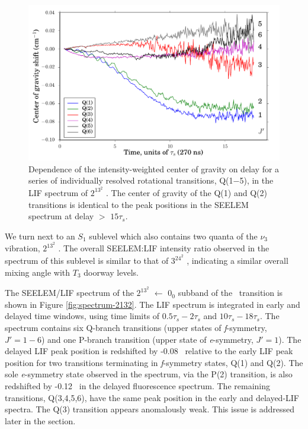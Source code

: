 \begin{figure}
  \caption{Dependence of the intensity-weighted center of gravity on
    delay for a series of individually resolved rotational
    transitions, Q(1$-$5), in the LIF spectrum of $2^13^2$ .
    The center of gravity of the Q(1) and Q(2) transitions is
    identical to the peak positions in the SEELEM spectrum at
    delay $>$ $15\tau_s$.}
  \label{fig:2132-q123456-cog-delay}
  \centering
  \vspace{1cm}
  \includegraphics[width=6in]{2132-q123456-cog-delay.pdf}
\end{figure}


We turn next to an $S_1$ sublevel which also contains two quanta of
the $\nu_3$ vibration, $2^13^2$ .  The overall SEELEM:LIF
intensity ratio observed in the spectrum of this sublevel is similar
to that of $3^24^2$ , indicating a similar overall mixing angle
with $T_3$ doorway levels.

The SEELEM/LIF spectrum of the $2^13^2$  $\leftarrow$ $0_0$
subband of the \AtoX\ transition is shown in Figure
\ref{fig:spectrum-2132}.  The LIF spectrum is integrated in early and
delayed time windows, using time limits of $0.5\tau_s-2\tau_s$ and
$10\tau_s-18\tau_s$.  The spectrum contains six Q-branch transitions
(upper states of \emph{f}-symmetry, $J'=1-6$) and one P-branch
transition (upper state of \emph{e}-symmetry, $J'=1$).  The delayed
LIF peak position is redshifted by -0.08 \rcm\ relative to the early
LIF peak position for two transitions terminating in \emph{f}-symmetry
states, Q(1) and Q(2).  The sole \emph{e}-symmetry state observed in
the spectrum, via the P(2) transition, is also redshifted by -0.12
\rcm\ in the delayed fluorescence spectrum.  The remaining
transitions, Q(3,4,5,6), have the same peak position in the early and
delayed-LIF spectra.  The Q(3) transition appears anomalously weak.
This issue is addressed later in the section.

